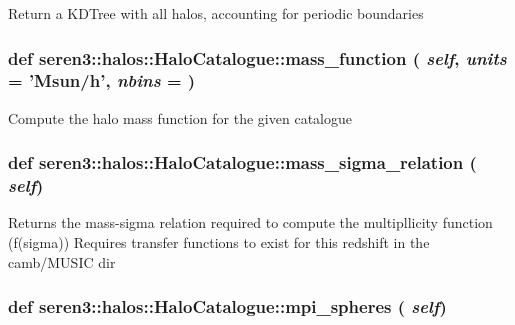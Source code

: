 \begin{DoxyVerb}
Return a KDTree with all halos, accounting for periodic boundaries
\end{DoxyVerb}
 \hypertarget{classseren3_1_1halos_1_1HaloCatalogue_ab9c07214f6ed43f83712c6b6ab63d014}{
\subsubsection[{mass\_\-function}]{\setlength{\rightskip}{0pt plus 5cm}def seren3::halos::HaloCatalogue::mass\_\-function ( {\em self}, \/   {\em units} = {\ttfamily 'Msun/h'}, \/   {\em nbins} = {})}}
\label{classseren3_1_1halos_1_1HaloCatalogue_ab9c07214f6ed43f83712c6b6ab63d014}
\begin{DoxyVerb}
Compute the halo mass function for the given catalogue
\end{DoxyVerb}
 \hypertarget{classseren3_1_1halos_1_1HaloCatalogue_adf398363cadc842f2f2795aa26675c82}{
\subsubsection[{mass\_\-sigma\_\-relation}]{\setlength{\rightskip}{0pt plus 5cm}def seren3::halos::HaloCatalogue::mass\_\-sigma\_\-relation ( {\em self})}}
\label{classseren3_1_1halos_1_1HaloCatalogue_adf398363cadc842f2f2795aa26675c82}
\begin{DoxyVerb}
Returns the mass-sigma relation required to compute the
multipllicity function (f(sigma))
Requires transfer functions to exist for this redshift in the camb/MUSIC dir
\end{DoxyVerb}
 \hypertarget{classseren3_1_1halos_1_1HaloCatalogue_a3b6e561ff1bb5ecaaccbba490948cf07}{
\subsubsection[{mpi\_\-spheres}]{\setlength{\rightskip}{0pt plus 5cm}def seren3::halos::HaloCatalogue::mpi\_\-spheres ( {\em self})}}

